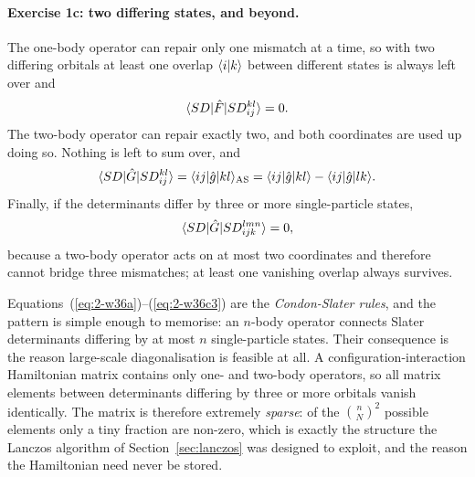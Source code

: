 \paragraph{Exercise 1c: two differing states, and beyond.}
The one-body operator can repair only one mismatch at a time, so with two
differing orbitals at least one overlap $\langle i \vert k \rangle$ between different
states is always left over and
\begin{equation}
  \langle SD | \hat{F} | SD_{ij}^{kl} \rangle = 0 .
  \label{eq:2-w36c1}
\end{equation}
The two-body operator can repair exactly two, and both coordinates are used
up doing so.  Nothing is left to sum over, and
\begin{equation}
  \langle SD | \hat{G} | SD_{ij}^{kl} \rangle
   = \langle ij|\hat{g}|kl\rangle_{\mathrm{AS}}
   = \langle ij|\hat{g}|kl\rangle - \langle ij|\hat{g}|lk\rangle .
  \label{eq:2-w36c2}
\end{equation}
Finally, if the determinants differ by three or more single-particle states,
\begin{equation}
  \langle SD | \hat{G} | SD_{ijk}^{lmn} \rangle = 0 ,
  \label{eq:2-w36c3}
\end{equation}
because a two-body operator acts on at most two coordinates and therefore
cannot bridge three mismatches; at least one vanishing overlap always
survives.

Equations~(\ref{eq:2-w36a})--(\ref{eq:2-w36c3}) are the \emph{Condon-Slater
rules}, and the pattern is simple enough to memorise: an $n$-body operator
connects Slater determinants differing by at most $n$ single-particle states.
Their consequence is the reason large-scale diagonalisation is feasible at
all.  A configuration-interaction Hamiltonian matrix contains only one- and
two-body operators, so all matrix elements between determinants differing by
three or more orbitals vanish identically.  The matrix is therefore extremely
\emph{sparse}: of the $\binom{n}{N}^2$ possible elements only a tiny fraction
are non-zero, which is exactly the structure the Lanczos algorithm of
Section~\ref{sec:lanczos} was designed to exploit, and the reason the
Hamiltonian need never be stored.

